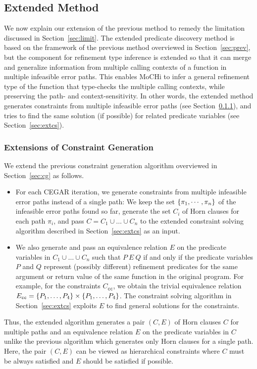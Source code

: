 \subsection{Extended Method}
\label{sec:ext}

We now explain our extension of the previous method to remedy the 
limitation discussed in Section~\ref{sec:limit}.  The extended predicate 
discovery method is based on the framework of the previous method 
overviewed in Section~\ref{sec:prev}, but the component for refinement 
type inference is extended so that it can merge and generalize 
information from multiple calling contexts of a function in multiple 
infeasible error paths.  This enables MoCHi to infer a general 
refinement type of the function that type-checks the multiple calling 
contexts, while preserving the path- and context-sensitivity.  In other 
words, the extended method generates constraints from multiple 
infeasible error paths (see Section~\ref{sec:extcg}), and tries to find 
the same solution (if possible) for related predicate variables (see 
Section~\ref{sec:extcs}).

\subsubsection{Extensions of Constraint Generation}
\label{sec:extcg}

We extend the previous constraint generation algorithm overviewed in 
Section~\ref{sec:cg} as follows.
\begin{itemize}
\item For each CEGAR iteration, we generate constraints from multiple 
infeasible error paths instead of a single path:  We keep the set 
\(\{{\pi_1,\cdots,\pi_n}\}\) of the infeasible error paths found so far, 
generate the set \(C_i\) of Horn clauses for each path \(\pi_i\), and 
pass \(C=C_1 \cup \dots \cup C_n\) to the extended constraint solving 
algorithm described in Section~\ref{sec:extcs} as an input.
\item We also generate and pass an equivalence relation \(E\) on the 
predicate variables in \(C_1 \cup \dots \cup C_n\) such that \(P\ E\ Q\) 
if and only if the predicate variables \(P\) and \(Q\) represent 
(possibly different) refinement predicates for the same argument or 
return value of the same function in the original program.  For example, 
for the constraints \(C_{\texttt{cc}}\), we obtain the trivial 
equivalence relation \(E_{\texttt{cc}}=\{{P_1,\dots,P_4}\} \times 
\{{P_1,\dots,P_4}\}\).  The constraint solving algorithm in 
Section~\ref{sec:extcs} exploits \(E\) to find general solutions for the 
constraints.
\end{itemize}
Thus, the extended algorithm generates a pair \((C,E)\) of Horn clauses 
\(C\) for multiple paths and an equivalence relation \(E\) on the 
predicate variables in \(C\) unlike the previous algorithm which 
generates only Horn clauses for a single path.  Here, the pair \((C,E)\) 
can be viewed as hierarchical constraints where \(C\) must be always 
satisfied and \(E\) should be satisfied if possible.

